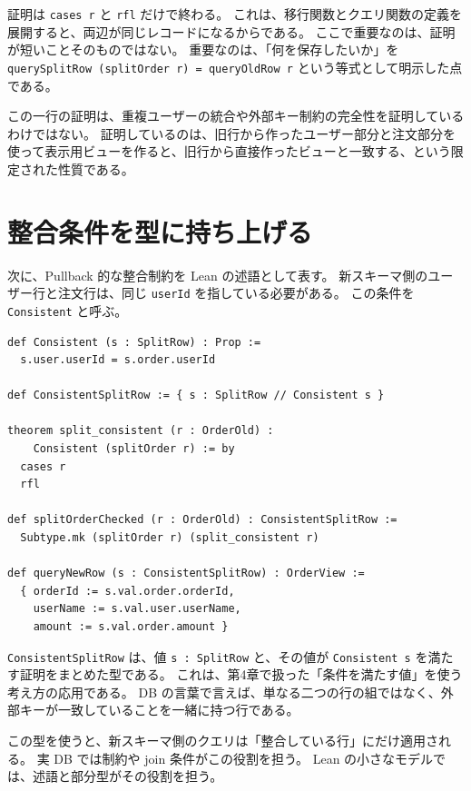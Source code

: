 証明は \texttt{cases r} と \texttt{rfl} だけで終わる。
これは、移行関数とクエリ関数の定義を展開すると、両辺が同じレコードになるからである。
ここで重要なのは、証明が短いことそのものではない。
重要なのは、「何を保存したいか」を \texttt{querySplitRow (splitOrder r) = queryOldRow r} という等式として明示した点である。

\begin{warningbox}
この一行の証明は、重複ユーザーの統合や外部キー制約の完全性を証明しているわけではない。
証明しているのは、旧行から作ったユーザー部分と注文部分を使って表示用ビューを作ると、旧行から直接作ったビューと一致する、という限定された性質である。
\end{warningbox}

\section{整合条件を型に持ち上げる}

次に、Pullback 的な整合制約を Lean の述語として表す。
新スキーマ側のユーザー行と注文行は、同じ \texttt{userId} を指している必要がある。
この条件を \texttt{Consistent} と呼ぶ。

\begin{listing}[htbp]
\begin{verbatim}
def Consistent (s : SplitRow) : Prop :=
  s.user.userId = s.order.userId

def ConsistentSplitRow := { s : SplitRow // Consistent s }

theorem split_consistent (r : OrderOld) :
    Consistent (splitOrder r) := by
  cases r
  rfl

def splitOrderChecked (r : OrderOld) : ConsistentSplitRow :=
  Subtype.mk (splitOrder r) (split_consistent r)

def queryNewRow (s : ConsistentSplitRow) : OrderView :=
  { orderId := s.val.order.orderId,
    userName := s.val.user.userName,
    amount := s.val.order.amount }
\end{verbatim}
\caption{共通キーによる整合条件}
\label{lst:ch26-consistency}
\end{listing}

\texttt{ConsistentSplitRow} は、値 \texttt{s : SplitRow} と、その値が \texttt{Consistent s} を満たす証明をまとめた型である。
これは、第4章で扱った「条件を満たす値」を使う考え方の応用である。
DB の言葉で言えば、単なる二つの行の組ではなく、外部キーが一致していることを一緒に持つ行である。

この型を使うと、新スキーマ側のクエリは「整合している行」にだけ適用される。
実 DB では制約や join 条件がこの役割を担う。
Lean の小さなモデルでは、述語と部分型がその役割を担う。

